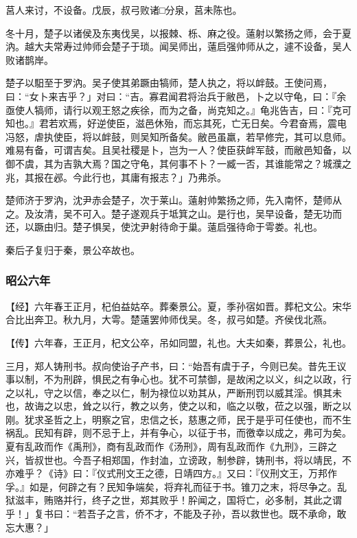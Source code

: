 \documentclass[]{article}
\begin{document}
莒人来讨，不设备。戊辰，叔弓败诸□分泉，莒未陈也。

冬十月，楚子以诸侯及东夷伐吴，以报棘、栎、麻之役。薳射以繁扬之师，会于夏汭。越大夫常寿过帅师会楚子于琐。闻吴师出，薳启强帅师从之，遽不设备，吴人败诸鹊岸。

楚子以馹至于罗汭。吴子使其弟蹶由犒师，楚人执之，将以衅鼓。王使问焉，曰：``女卜来吉乎？」对曰：``吉。寡君闻君将治兵于敝邑，卜之以守龟，曰：『余亟使人犒师，请行以观王怒之疾徐，而为之备，尚克知之。』龟兆告吉，曰：『克可知也。』君若欢焉，好逆使臣，滋邑休殆，而忘其死，亡无日矣。今君奋焉，震电冯怒，虐执使臣，将以衅鼓，则吴知所备矣。敝邑虽羸，若早修完，其可以息师。难易有备，可谓吉矣。且吴社稷是卜，岂为一人？使臣获衅军鼓，而敝邑知备，以御不虞，其为吉孰大焉？国之守龟，其何事不卜？一臧一否，其谁能常之？城濮之兆，其报在邲。今此行也，其庸有报志？」乃弗杀。

楚师济于罗汭，沈尹赤会楚子，次于莱山。薳射帅繁扬之师，先入南怀，楚师从之。及汝清，吴不可入。楚子遂观兵于坻箕之山。是行也，吴早设备，楚无功而还，以蹶由归。楚子惧吴，使沈尹射待命于巢。薳启强待命于雩娄。礼也。

秦后子复归于秦，景公卒故也。

\hypertarget{header-n2464}{%
\subsubsection{昭公六年}\label{header-n2464}}

【经】六年春王正月，杞伯益姑卒。葬秦景公。夏，季孙宿如晋。葬杞文公。宋华合比出奔卫。秋九月，大雩。楚薳罢帅师伐吴。冬，叔弓如楚。齐侯伐北燕。

【传】六年春，王正月，杞文公卒，吊如同盟，礼也。大夫如秦，葬景公，礼也。

三月，郑人铸刑书。叔向使诒子产书，曰：``始吾有虞于子，今则已矣。昔先王议事以制，不为刑辟，惧民之有争心也。犹不可禁御，是故闲之以义，纠之以政，行之以礼，守之以信，奉之以仁，制为禄位以劝其从，严断刑罚以威其淫。惧其未也，故诲之以忠，耸之以行，教之以务，使之以和，临之以敬，莅之以强，断之以刚。犹求圣哲之上，明察之官，忠信之长，慈惠之师，民于是乎可任使也，而不生祸乱。民知有辟，则不忌于上，并有争心，以征于书，而徼幸以成之，弗可为矣。夏有乱政而作《禹刑》，商有乱政而作《汤刑》，周有乱政而作《九刑》，三辟之兴，皆叔世也。今吾子相郑国，作封洫，立谤政，制参辟，铸刑书，将以靖民，不亦难乎？《诗》曰：『仪式刑文王之德，日靖四方。』又曰：『仪刑文王，万邦作孚。』如是，何辟之有？民知争端矣，将弃礼而征于书。锥刀之末，将尽争之。乱狱滋丰，贿赂并行，终子之世，郑其败乎！肸闻之，国将亡，必多制，其此之谓乎！」复书曰：``若吾子之言，侨不才，不能及子孙，吾以救世也。既不承命，敢忘大惠？」
\end{document}
